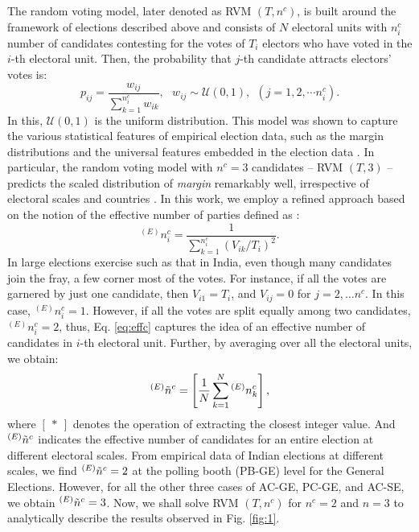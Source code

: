 \documentclass[reprint, pre, twocolumn, aps, showpacs, superscriptaddress]{revtex4-2}
\begin{document}
The random voting model, later denoted as {RVM $(T, n^c)$}, is built around the framework of elections described above and consists of $N$ electoral units with $n^c_i$ number of candidates contesting for the votes of $T_i$ electors who have voted in the $i$-th electoral unit. Then, the probability that $j$-th candidate attracts electors' votes is:
\begin{equation}
    p_{ij} = \frac{w_{ij}}{\sum_{k=1}^{n^c_i} w_{ik}}, ~~~w_{ij} \sim \mathcal{U}(0, 1), ~~ (j = 1, 2, \cdots n^c_i).
    \label{eq:prob}
\end{equation}
In this, $\mathcal{U}(0, 1)$ is the uniform distribution. This model was shown to capture the various statistical features of empirical election data, such as the margin distributions and the universal features embedded in the election data \cite{pal2024universal}. In particular, the random voting model with $n^c = 3$ candidates -- {RVM $(T, 3)$} -- predicts the scaled distribution of \emph{margin} remarkably well, irrespective of electoral scales and countries \cite{pal2024universal}. In this work, we employ a refined approach based on the notion of the effective number of parties defined as \cite{laakso1979effective}:
\begin{equation}
    ^{(E)}n^c_i = \frac{1}{\sum_{k=1}^{n^c_i} (V_{ik} / T_{i})^2}.
    \label{eq:effc}
\end{equation}
In large elections exercise such as that in India, even though many candidates join the fray, a few corner most of the votes. For instance, if all the votes are garnered by just one candidate, then $V_{i1}=T_i$, and $V_{ij}=0$ for $j=2, \dots n^c$. In this case, $^{(E)}n^c_i=1$. However, if all the votes are split equally among two candidates, $^{(E)}n^c_i=2$, thus, Eq. \ref{eq:effc} captures the idea of an effective number of candidates in $i$-th electoral unit. Further, by averaging over all the electoral units, we obtain: 
\begin{equation}
    ^{(E)}\Tilde{n}^c =  \left[\frac{1}{N}\sum_{k=1}^{N}{}^{(E)}n^{c}_k \right],
\end{equation}
where $\left[\:*\:\right]$ denotes the operation of extracting the closest integer value. And $^{(E)}\Tilde{n}^c $ indicates the effective number of candidates for an entire election at different electoral scales. From empirical data of Indian elections at different scales, we find $^{(E)}\Tilde{n}^c = 2$ at the polling booth (PB-GE) level for the General Elections. However, for all the other three cases of AC-GE, PC-GE, and AC-SE, we obtain $^{(E)}\Tilde{n}^c = 3$. Now, we shall solve RVM $(T, n^c)$ for $n^c = 2$ and $n = 3$ to analytically describe the results observed in Fig. \ref{fig:1}.\\
\end{document}

